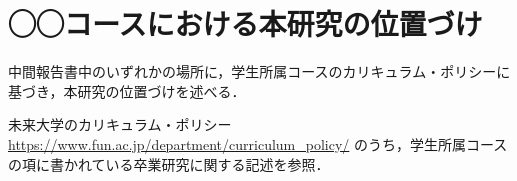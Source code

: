 \section{◯◯コースにおける本研究の位置づけ}
中間報告書中のいずれかの場所に，学生所属コースのカリキュラム・ポリシーに基づき，本研究の位置づけを述べる．

未来大学のカリキュラム・ポリシー
\url{https://www.fun.ac.jp/department/curriculum_policy/} のうち，学生所属コースの項に書かれている卒業研究に関する記述を参照．